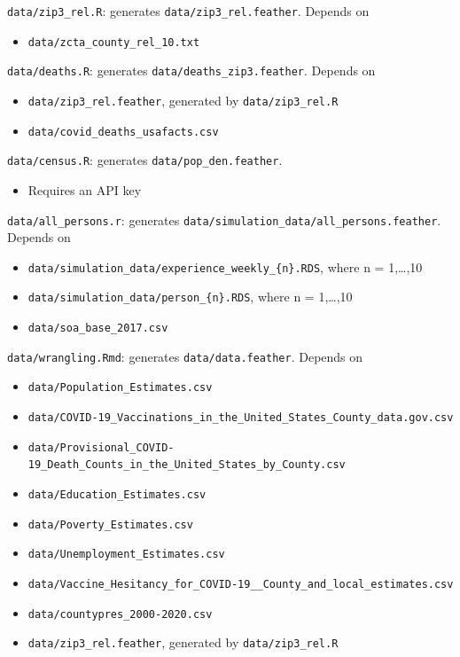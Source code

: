 \documentclass[
]{article}
\providecommand{\tightlist}{%
  \setlength{\itemsep}{0pt}\setlength{\parskip}{0pt}}
\begin{document}
\texttt{data/zip3\_rel.R}: generates \texttt{data/zip3\_rel.feather}.
Depends on

\begin{itemize}
\tightlist
\item
  \texttt{data/zcta\_county\_rel\_10.txt}
\end{itemize}

\texttt{data/deaths.R}: generates \texttt{data/deaths\_zip3.feather}.
Depends on

\begin{itemize}
\tightlist
\item
  \texttt{data/zip3\_rel.feather}, generated by
  \texttt{data/zip3\_rel.R}
\item
  \texttt{data/covid\_deaths\_usafacts.csv}
\end{itemize}

\texttt{data/census.R}: generates \texttt{data/pop\_den.feather}.

\begin{itemize}
\tightlist
\item
  Requires an API key
\end{itemize}

\texttt{data/all\_persons.r}: generates
\texttt{data/simulation\_data/all\_persons.feather}. Depends on

\begin{itemize}
\tightlist
\item
  \texttt{data/simulation\_data/experience\_weekly\_\{n\}.RDS}, where n
  = 1,\ldots,10
\item
  \texttt{data/simulation\_data/person\_\{n\}.RDS}, where n =
  1,\ldots,10
\item
  \texttt{data/soa\_base\_2017.csv}
\end{itemize}

\texttt{data/wrangling.Rmd}: generates \texttt{data/data.feather}.
Depends on

\begin{itemize}
\tightlist
\item
  \texttt{data/Population\_Estimates.csv}
\item
  \texttt{data/COVID-19\_Vaccinations\_in\_the\_United\_States\_County\_data.gov.csv}
\item
  \texttt{data/Provisional\_COVID-19\_Death\_Counts\_in\_the\_United\_States\_by\_County.csv}
\item
  \texttt{data/Education\_Estimates.csv}
\item
  \texttt{data/Poverty\_Estimates.csv}
\item
  \texttt{data/Unemployment\_Estimates.csv}
\item
  \texttt{data/Vaccine\_Hesitancy\_for\_COVID-19\_\_County\_and\_local\_estimates.csv}
\item
  \texttt{data/countypres\_2000-2020.csv}
\item
  \texttt{data/zip3\_rel.feather}, generated by
  \texttt{data/zip3\_rel.R}
\end{itemize}
\end{document}
